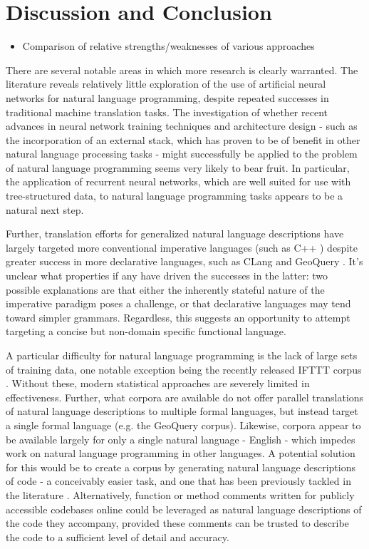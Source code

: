 \documentclass[a4paper,11pt]{proposal}
\begin{document}
\section{Discussion and Conclusion} \label{sec:disc}
\begin{itemize}
\item Comparison of relative strengths/weaknesses of various approaches
\end{itemize}

There are several notable areas in which more research is clearly warranted. The literature reveals relatively little exploration of the use of artificial neural networks for natural language programming, despite repeated successes in traditional machine translation tasks.  
The investigation of whether recent advances in neural network training techniques and architecture design - such as the incorporation of an external stack, which has proven to be of benefit in other natural language processing tasks \cite{das1992} - might successfully be applied to the problem of natural language programming seems very likely to bear fruit. In particular, the application of recurrent neural networks, which are well suited for use with tree-structured data, to natural language programming tasks appears to be a natural next step.

Further, translation efforts for generalized natural language descriptions have largely targeted more conventional imperative languages (such as C++ \cite{mou2015}) despite greater success in more declarative languages, such as CLang \cite{kate2005} and GeoQuery \cite{wong2006}. It's unclear what properties if any have driven the successes in the latter: two possible explanations are that either the inherently stateful nature of the imperative paradigm poses a challenge, or that declarative languages may tend toward simpler grammars. Regardless, this suggests an opportunity to attempt targeting a concise but non-domain specific functional language.

A particular difficulty for natural language programming is the lack of large sets of training data, one notable exception being the recently released IFTTT corpus \cite{quirk2015}. Without these, modern statistical approaches are severely limited in effectiveness. Further, what corpora are available do not offer parallel translations of natural language descriptions to multiple formal languages, but instead target a single formal language (e.g. the GeoQuery corpus). Likewise, corpora appear to be available largely for only a single natural language - English - which impedes work on natural language programming in other languages. A potential solution for this would be to create a corpus by generating natural language descriptions of code - a conceivably easier task, and one that has been previously tackled in the literature \cite{sridhara2010}. Alternatively, function or method comments written for publicly accessible codebases online could be leveraged as natural language descriptions of the code they accompany, provided these comments can be trusted to describe the code to a sufficient level of detail and accuracy.



\newpage


\end{document}
